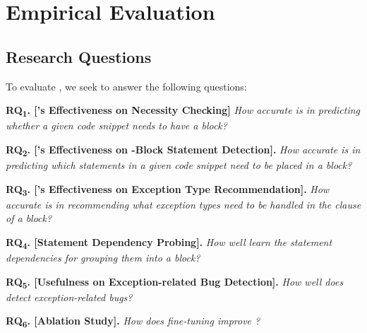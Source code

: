 \vspace{-8pt}
\section{Empirical Evaluation}
\label{sec:eval}

\subsection{Research Questions}

To evaluate {\tool}, we seek to answer the following questions:

\vspace{2pt}

\noindent \textbf{RQ\textsubscript{1}. [{\xblock}'s Effectiveness on 
    Necessity Checking]} {\em How accurate is {\tool} in predicting
  whether a given code snippet needs to have a 
  block?}
    


\vspace{2pt}
\noindent \textbf{RQ\textsubscript{2}. [{\xstate}'s Effectiveness on -Block
    Statement Detection].} {\em How accurate is {\tool} in predicting
  which statements in a given code snippet need to be placed in a
   block?}


\vspace{2pt}
\noindent \textbf{RQ\textsubscript{3}. [{\xtype}'s Effectiveness on Exception Type Recommendation].}
{\em How accurate is {\tool} in recommending what exception types need to be handled in the  clause of a  block?}

\vspace{2pt}
\noindent \textbf{RQ\textsubscript{4}. [Statement Dependency Probing].}
{\em How well {\tool} learn the statement dependencies for grouping them into a  block?}

\vspace{2pt}
\noindent \textbf{RQ\textsubscript{5}. [Usefulness on
    Exception-related Bug Detection].}  {\em How well does {\tool}
  detect exception-related bugs?}

\vspace{2pt}
\noindent \textbf{RQ\textsubscript{6}. [Ablation Study].} {\em How does
 fine-tuning improve {\tool}?}




